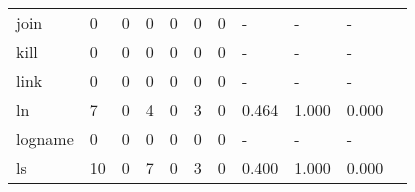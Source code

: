 \begin{longtable}{lp{1.2cm}p{1.2cm}p{1.2cm}p{1.2cm}p{1.2cm}p{1.2cm}p{1.2cm}p{1.2cm}p{1.2cm}p{1.2cm}}
join      &                                     0 &                                                  0 &                                                0 &                                               0 &                                                0 &                                              0 &                                                  - &                                                  - &                                                  - \\
kill      &                                     0 &                                                  0 &                                                0 &                                               0 &                                                0 &                                              0 &                                                  - &                                                  - &                                                  - \\
link      &                                     0 &                                                  0 &                                                0 &                                               0 &                                                0 &                                              0 &                                                  - &                                                  - &                                                  - \\
ln        &                                     7 &                                                  0 &                                                4 &                                               0 &                                                3 &                                              0 &                                              0.464 &                                              1.000 &                                              0.000 \\
logname   &                                     0 &                                                  0 &                                                0 &                                               0 &                                                0 &                                              0 &                                                  - &                                                  - &                                                  - \\
ls        &                                    10 &                                                  0 &                                                7 &                                               0 &                                                3 &                                              0 &                                              0.400 &                                              1.000 &                                              0.000 \\

\end{longtable}
